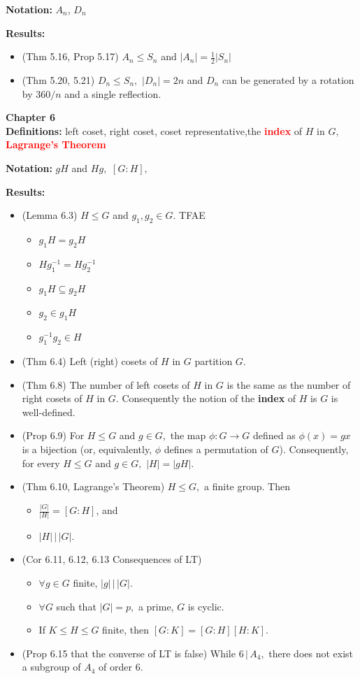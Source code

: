 \documentclass[12pt]{article}
\renewcommand{\emph}[1]{\textsf{\textbf{#1}}}
\newcommand{\bfr}[1]{\textbf{\textcolor{red}{#1}}}
\begin{document}
\noindent \textbf{Notation:} $A_n$, $D_n$

\noindent \textbf{Results:}
\begin{itemize}
	\item (Thm 5.16, Prop 5.17) $A_n \leq S_n$ and $|A_n| = \frac{1}{2}|S_n|$
	\item (Thm 5.20, 5.21) $D_n \leq S_n,$ $|D_n|=2n$ and $D_n$ can be generated by a rotation by $360/n$ and a single reflection.
\end{itemize}

\noindent \textbf{Chapter 6}\\

\noindent \textbf{Definitions:} left coset, right coset, coset representative,the  \bfr{index} of $H$ in $G,$ \bfr{Lagrange's Theorem}

\noindent \textbf{Notation:} $gH$ and $Hg,$ $[G:H],$

\noindent \textbf{Results:}
\begin{itemize}
	\item (Lemma 6.3) $H\leq G$ and $g_1,g_2 \in G$. TFAE
		\begin{itemize}
		\item $g_1H=g_2H$
		\item $Hg_1^{-1}=Hg_2^{-1}$
		\item $g_1H \subseteq g_2H$
		\item $g_2 \in g_1H$
		\item $g_1^{-1}g_2 \in H$
		\end{itemize}
	\item (Thm 6.4) Left (right) cosets of $H$ in $G$ partition $G.$
	\item (Thm 6.8) The number of left cosets of $H$ in $G$ is the same as the number of right cosets of $H$ in $G$. Consequently the notion of the \emph{index} of $H$ is $G$ is well-defined.
	\item (Prop 6.9) For $H \leq G$ and $g \in G,$ the map $\phi:G \to G$ defined as $\phi(x)=gx$ is a bijection (or, equivalently, $\phi$ defines a permutation of $G$). Consequently, for every $H \leq G$ and $g \in G,$ $|H|=|gH|.$
	\item (Thm 6.10, Lagrange's Theorem) $H \leq G,$ a finite group. Then
		\begin{itemize}
		\item $\frac{|G|}{|H|}=[G:H]$, and
		\item $|H| \, \Big| \, |G|.$
		\end{itemize}
	\item (Cor 6.11, 6.12, 6.13 Consequences of LT) 
		\begin{itemize}
		\item $\forall g \in G$ finite, $|g| \, \Big| \, |G|.$
		\item $\forall G$ such that $|G|=p,$ a prime, $G$ is cyclic.
		\item If $K \leq H \leq G$ finite, then $[G:K]=[G:H][H:K].$
		\end{itemize}
	\item (Prop 6.15 that the converse of LT is false) While $6 \, \Big| \, A_4,$ there does not exist a subgroup of $A_4$ of order 6.
\end{itemize}
\end{document}
